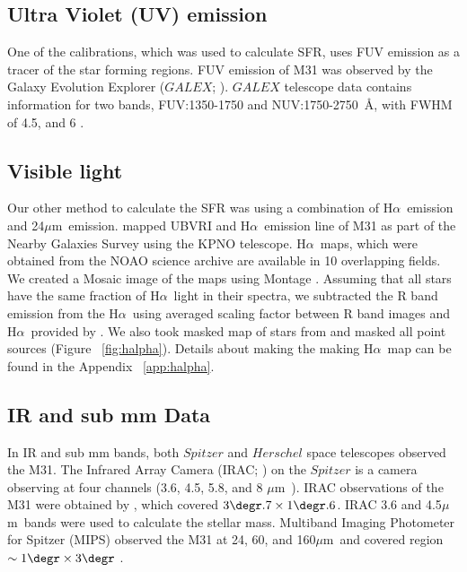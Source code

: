 \documentclass[useAMS,usenatbib]{mn2e}
\newcommand \halpha    {H$\alpha $\ }
\newcommand \um    {$\mu$m\ }
\begin{document}
\subsection{Ultra Violet (UV) emission}

One of the calibrations, which was used to calculate SFR, uses FUV emission as a tracer of the star forming regions. FUV emission of M31 was observed by the Galaxy Evolution Explorer ($GALEX$; \citep{Martin05}). $GALEX$ telescope data contains information for two bands, FUV:1350-1750 and NUV:1750-2750~\AA, with FWHM of 4\arcsec .5, and 6 \arcsec.

\subsection{Visible light}
Our other method to calculate the SFR was using a combination of \halpha emission and 24\um emission. \cite{Massey06, Massey07} mapped UBVRI and \halpha emission line of M31 as part of the Nearby Galaxies Survey using the KPNO telescope. \halpha maps, which were obtained from the NOAO science archive are available in 10 overlapping fields. We created a Mosaic image of the maps using Montage \citep{Berriman08}. Assuming that all stars have the same fraction of \halpha light in their spectra, we subtracted the R band emission from the \halpha using averaged scaling factor between R band images and \halpha provided by \cite{Azimlu11}. We also took masked map of stars from \cite{Azimlu11} and masked all point sources (Figure ~\ref{fig:halpha}). Details about making the making \halpha map can be found in the Appendix ~\ref{app:halpha}.

\subsection{IR and sub mm Data}
In IR and sub mm bands, both $Spitzer$ \citep{Wener04} and $Herschel$ \citep{Pilbratt10}  space telescopes observed the M31. The Infrared Array Camera (IRAC; \citep{Fazio04}) on the $Spitzer$ is a camera observing at four channels (3.6, 4.5, 5.8, and 8 \um). IRAC observations of the M31 were obtained by \cite{Barmby06}, which covered $3\degr.7 \times 1\degr.6$. IRAC 3.6 and 4.5\um bands  were used to calculate the stellar mass. Multiband Imaging Photometer for Spitzer (MIPS) observed the  M31 at 24, 60, and 160\um and covered region $\sim 1\degr \times 3\degr$ \citep{Gordon06}.
\end{document}
